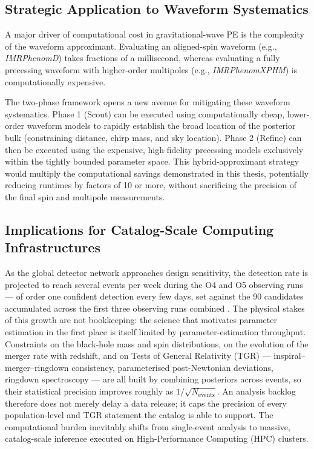 \documentclass[12pt]{article}
\begin{document}
\subsection{Strategic Application to Waveform Systematics}
A major driver of computational cost in gravitational-wave PE is the complexity of the waveform approximant. Evaluating an aligned-spin waveform (e.g., \textit{IMRPhenomD}) takes fractions of a millisecond, whereas evaluating a fully precessing waveform with higher-order multipoles (e.g., \textit{IMRPhenomXPHM}) is computationally expensive.

The two-phase framework opens a new avenue for mitigating these waveform systematics. Phase 1 (Scout) can be executed using computationally cheap, lower-order waveform models to rapidly establish the broad location of the posterior bulk (constraining distance, chirp mass, and sky location). Phase 2 (Refine) can then be executed using the expensive, high-fidelity precessing models exclusively within the tightly bounded parameter space. This hybrid-approximant strategy would multiply the computational savings demonstrated in this thesis, potentially reducing runtimes by factors of 10 or more, without sacrificing the precision of the final spin and multipole measurements.

\subsection{Implications for Catalog-Scale Computing Infrastructures}
\label{sec:catalog}
As the global detector network approaches design sensitivity, the detection rate is projected to reach several events per week during the O4 and O5 observing runs \cite{ObservingScenarios} --- of order one confident detection every few days, set against the 90 candidates accumulated across the first three observing runs combined \cite{GWTC3}. The physical stakes of this growth are not bookkeeping: the science that motivates parameter estimation in the first place is itself limited by parameter-estimation throughput. Constraints on the black-hole mass and spin distributions, on the evolution of the merger rate with redshift, and on Tests of General Relativity (TGR) --- inspiral--merger--ringdown consistency, parameterised post-Newtonian deviations, ringdown spectroscopy --- are all built by combining posteriors across events, so their statistical precision improves roughly as $1/\sqrt{N_{\mathrm{events}}}$. An analysis backlog therefore does not merely delay a data release; it caps the precision of every population-level and TGR statement the catalog is able to support. The computational burden inevitably shifts from single-event analysis to massive, catalog-scale inference executed on High-Performance Computing (HPC) clusters.
\end{document}
